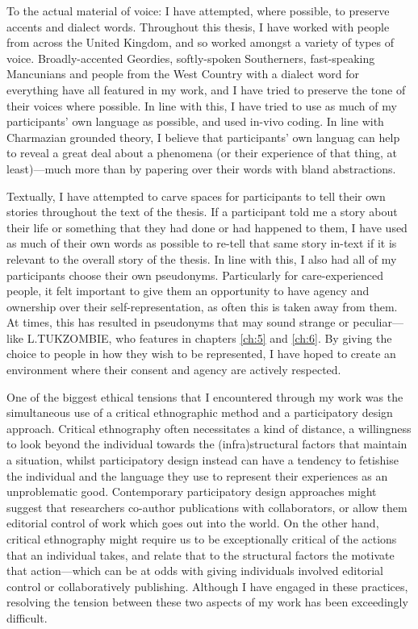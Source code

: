 To the actual material of voice: I have attempted, where possible, to preserve accents and dialect words. Throughout this thesis, I have worked with people from across the United Kingdom, and so worked amongst a variety of types of voice. Broadly-accented Geordies, softly-spoken Southerners, fast-speaking Mancunians and people from the West Country with a dialect word for everything have all featured in my work, and I have tried to preserve the tone of their voices where possible. In line with this, I have tried to use as much of my participants' own language as possible, and used in-vivo coding. In line with Charmazian grounded theory, I believe that participants' own languag can help to reveal a great deal about a phenomena (or their experience of that thing, at least)—much more than by papering over their words with bland abstractions.   

Textually, I have attempted to carve spaces for participants to tell their own stories throughout the text of the thesis. If a participant told me a story about their life or something that they had done or had happened to them, I have used as much of their own words as possible to re-tell that same story in-text if it is relevant to the overall story of the thesis. In line with this, I also had all of my participants choose their own pseudonyms. Particularly for care-experienced people, it felt important to give them an opportunity to have agency and ownership over their self-representation, as often this is taken away from them. At times, this has resulted in pseudonyms that may sound strange or peculiar—like L.TUKZOMBIE, who features in chapters \ref{ch:5} and \ref{ch:6}. By giving the choice to people in how they wish to be represented, I have hoped to create an environment where their consent and agency are actively respected.

One of the biggest ethical tensions that I encountered through my work was the simultaneous use of a critical ethnographic method and a participatory design approach. Critical ethnography often necessitates a kind of distance, a willingness to look beyond the individual towards the (infra)structural factors that maintain a situation, whilst participatory design instead can have a tendency to fetishise the individual and the language they use to represent their experiences as an unproblematic good. Contemporary participatory design approaches might suggest that researchers co-author publications with collaborators, or allow them editorial control of work which goes out into the world. On the other hand, critical ethnography might require us to be exceptionally critical of the actions that an individual takes, and relate that to the structural factors the motivate that action—which can be at odds with giving individuals involved editorial control or collaboratively publishing. Although I have engaged in these practices, resolving the tension between these two aspects of my work has been exceedingly difficult.

